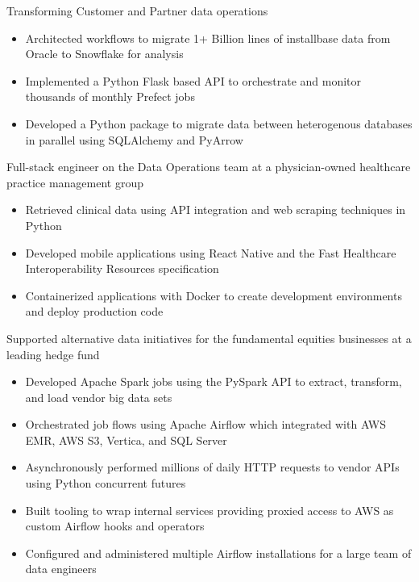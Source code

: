 \documentclass[10pt,a4paper,sans]{moderncv}        %
\begin{document}
{Transforming Customer and Partner data operations
\begin{itemize}
	\item Architected workflows to migrate 1+ Billion lines of installbase data from Oracle to Snowflake for analysis
	\item Implemented a Python Flask based API to orchestrate and monitor thousands of monthly Prefect jobs
	\item Developed a Python package to migrate data between heterogenous databases in parallel using SQLAlchemy and PyArrow
\end{itemize}
}

{Full-stack engineer on the Data Operations team at a physician-owned healthcare practice management group
\begin{itemize}
	\item Retrieved clinical data using API integration and web scraping techniques in Python
	\item Developed mobile applications using React Native and the Fast Healthcare Interoperability Resources specification
	\item Containerized applications with Docker to create development environments and deploy production code
\end{itemize}}

{Supported alternative data initiatives for the fundamental equities businesses at a leading hedge fund
\begin{itemize}
	\item Developed Apache Spark jobs using the PySpark API to extract, transform, and load vendor big data sets
	\item Orchestrated job flows using Apache Airflow which integrated with AWS EMR, AWS S3, Vertica, and SQL Server
	\item Asynchronously performed millions of daily HTTP requests to vendor APIs using Python concurrent futures
	\item Built tooling to wrap internal services providing proxied access to AWS as custom Airflow hooks and operators
	\item Configured and administered multiple Airflow installations for a large team of data engineers
\end{itemize}}
\end{document}
